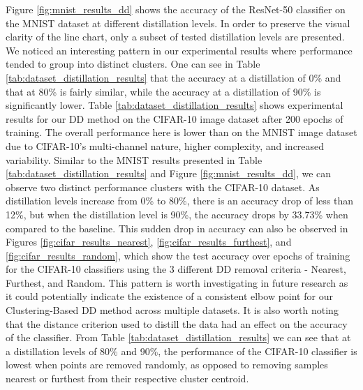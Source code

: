 Figure \ref{fig:mnist_results_dd} shows the accuracy of the ResNet-50 classifier on the MNIST dataset at different distillation levels. In order to preserve the visual clarity of the line chart, only a subset of tested distillation levels are presented. We noticed an interesting pattern in our experimental results where performance tended to group into distinct clusters. One can see in Table \ref{tab:dataset_distillation_results} that the accuracy at a distillation of 0\% and that at 80\% is fairly similar, while the accuracy at a distillation of 90\% is significantly lower. Table \ref{tab:dataset_distillation_results} shows experimental results for our DD method on the CIFAR-10 image dataset after 200 epochs of training. The overall performance here is lower than on the MNIST image dataset due to CIFAR-10's multi-channel nature, higher complexity, and increased variability. Similar to the MNIST results presented in Table \ref{tab:dataset_distillation_results} and Figure \ref{fig:mnist_results_dd}, we can observe two distinct performance clusters with the CIFAR-10 dataset. As distillation levels increase from 0\% to 80\%, there is an accuracy drop of less than 12\%, but when the distillation level is 90\%, the accuracy drops by 33.73\% when compared to the baseline. This sudden drop in accuracy can also be observed in Figures \ref{fig:cifar_results_nearest}, \ref{fig:cifar_results_furthest}, and \ref{fig:cifar_results_random}, which show the test accuracy over epochs of training for the CIFAR-10 classifiers using the 3 different DD removal criteria - Nearest, Furthest, and Random. This pattern is worth investigating in future research as it could potentially indicate the existence of a consistent elbow point for our Clustering-Based DD method across multiple datasets. It is also worth noting that the distance criterion used to distill the data had an effect on the accuracy of the classifier. From Table \ref{tab:dataset_distillation_results} we can see that at a distillation levels of 80\% and 90\%, the performance of the CIFAR-10 classifier is lowest when points are removed randomly, as opposed to removing samples nearest or furthest from their respective cluster centroid. 




